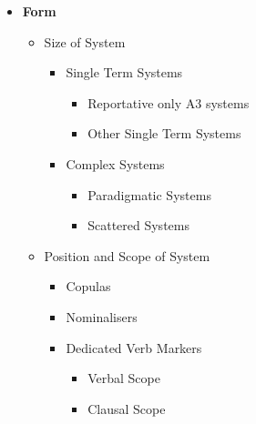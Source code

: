 \begin{figure}
        \begin{multicols}{2}
        \begin{itemize}
                \item[] \textbf{Form}
                \begin{itemize}
                        \item[] Size of System
                        \begin{itemize}
                                \item Single Term Systems
                                \begin{itemize}
                                        \item Reportative only A3 systems
                                        \item Other Single Term Systems
                                \end{itemize}
                                \item Complex Systems
                                \begin{itemize}
                                        \item Paradigmatic Systems
                                        \item Scattered Systems
                                \end{itemize}
                        \end{itemize}
                        \item[] Position and Scope of System
                        \begin{itemize}
                                \item Copulas
                                \item Nominalisers
                                \item Dedicated Verb Markers
                                \begin{itemize}
                                        \item Verbal Scope
                                        \item Clausal Scope
                                \end{itemize}
                        \end{itemize}
                \end{itemize}
        \end{itemize}

\end{multicols}
\end{figure}
